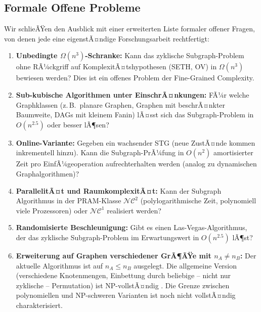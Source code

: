 ﻿\documentclass[a4paper,12pt]{article}
\theoremstyle{definition}
\begin{document}
\subsection{Formale Offene Probleme}

Wir schlieÃŸen den Ausblick mit einer erweiterten Liste formaler offener Fragen, von
denen jede eine eigenstÃ¤ndige Forschungsarbeit rechtfertigt:

\begin{enumerate}
  \item \textbf{Unbedingte $\Omega(n^3)$-Schranke:} Kann das zyklische Subgraph-Problem
        ohne RÃ¼ckgriff auf KomplexitÃ¤tshypothesen (SETH, OV) in $\Omega(n^3)$ bewiesen
        werden? Dies ist ein offenes Problem der Fine-Grained Complexity.

  \item \textbf{Sub-kubische Algorithmen unter EinschrÃ¤nkungen:} FÃ¼r welche
        Graphklassen (z.\,B.\ planare Graphen, Graphen mit beschrÃ¤nkter Baumweite,
        DAGs mit kleinem Fanin) lÃ¤sst sich das Subgraph-Problem in $O(n^{2.5})$ oder
        besser lÃ¶sen?

  \item \textbf{Online-Variante:} Gegeben ein wachsender STG (neue ZustÃ¤nde kommen
        inkrementell hinzu). Kann die Subgraph-PrÃ¼fung in $O(n^2)$ amortisierter Zeit
        pro EinfÃ¼geoperation aufrechterhalten werden (analog zu dynamischen Graphalgorithmen)?

  \item \textbf{ParallelitÃ¤t und RaumkomplexitÃ¤t:} Kann der Subgraph Algorithmus
        in der PRAM-Klasse $\mathcal{NC}^2$ (polylogarithmische Zeit, polynomiell viele
        Prozessoren) oder $\mathcal{NC}^1$ realisiert werden?

  \item \textbf{Randomisierte Beschleunigung:} Gibt es einen Las-Vegas-Algorithmus, der
        das zyklische Subgraph-Problem im Erwartungswert in $O(n^{2.5})$ lÃ¶st?

  \item \textbf{Erweiterung auf Graphen verschiedener GrÃ¶ÃŸe mit $n_A \neq n_B$:}
        Der aktuelle Algorithmus ist auf $n_A \leq n_B$ ausgelegt. Die allgemeine
        Version (verschiedene Knotenmengen, Einbettung durch beliebige -- nicht nur
        zyklische -- Permutation) ist NP-vollstÃ¤ndig
        \cite{cook1971complexity}. Die Grenze zwischen polynomiellen und
        NP-schweren Varianten ist noch nicht vollstÃ¤ndig charakterisiert.


\end{enumerate}
\end{document}
